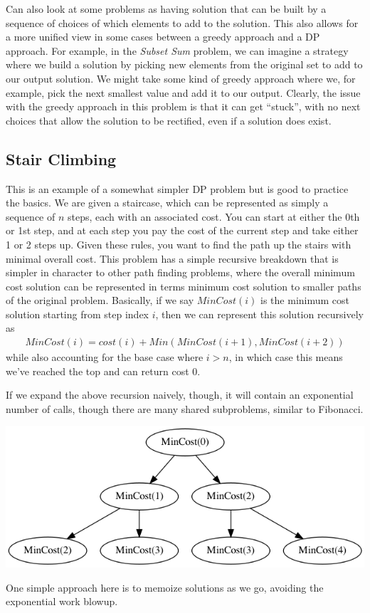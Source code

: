 \documentclass[10pt,a4paper]{article}
\begin{document}
Can also look at some problems as having solution that can be built by a sequence of choices of which elements to add to the solution. This also allows for a more unified view in some cases between a greedy approach and a DP approach. For example, in the \textit{Subset Sum} problem, we can imagine a strategy where we build a solution by picking new elements from the original set to add to our output solution. We might take some kind of greedy approach where we, for example, pick the next smallest value and add it to our output. Clearly, the issue with the greedy approach in this problem is that it can get ``stuck'', with no next choices that allow the solution to be rectified, even if a solution does exist.

\subsection*{Stair Climbing}

This is an example of a somewhat simpler DP problem but is good to practice the basics. We are given a staircase, which can be represented as simply a sequence of $n$ steps, each with an associated cost. You can start at either the 0th or 1st step, and at each step you pay the cost of the current step and take either 1 or 2 steps up. Given these rules, you want to find the path up the stairs with minimal overall cost. This problem has a simple recursive breakdown that is simpler in character to other path finding problems, where the overall minimum cost solution can be represented in terms minimum cost solution to smaller paths of the original problem. Basically, if we say $\mathit{MinCost}(i)$ is the minimum cost solution starting from step index $i$, then we can represent this solution recursively as
\begin{align*}
    \mathit{MinCost}(i) = cost(i) + \mathit{Min}(\mathit{MinCost}(i+1), \mathit{MinCost}(i+2))
\end{align*}
while also accounting for the base case where $i > n$, in which case this means we've reached the top and can return cost 0.

If we expand the above recursion naively, though, it will contain an exponential number of calls, though there are many shared subproblems, similar to Fibonacci.
\begin{center}
    \includegraphics[scale=0.35]{diagrams/stairs_tree.png}
\end{center}
One simple approach here is to memoize solutions as we go, avoiding the exponential work blowup.
\end{document}
